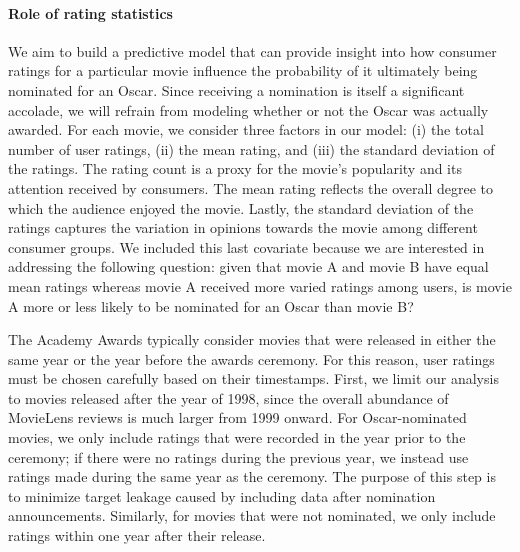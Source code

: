\documentclass[dvipsnames]{article}
\begin{document}
\paragraph{Role of rating statistics}\label{ssssec:lr}

We aim to build a predictive model that can provide insight into how consumer ratings for a particular movie influence the probability of it ultimately being nominated for an Oscar. Since receiving a nomination is itself a significant accolade, we will refrain from modeling whether or not the Oscar was actually awarded. For each movie, we consider three factors in our model: (i) the total number of user ratings, (ii) the mean rating, and (iii) the standard deviation of the ratings. The rating count is a proxy for the movie's popularity and its attention received by consumers. The mean rating reflects the overall degree to which the audience enjoyed the movie. Lastly, the standard deviation of the ratings captures the variation in opinions towards the movie among different consumer groups. We included this last covariate because we are interested in addressing the following question: given that movie A and movie B have equal mean ratings whereas movie A received more varied ratings among users, is movie A more or less likely to be nominated for an Oscar than movie B? 

The Academy Awards typically consider movies that were released in either the same year or the year before the awards ceremony. For this reason, user ratings must be chosen carefully based on their timestamps. First, we limit our analysis to movies released after the year of 1998, since the overall abundance of MovieLens reviews is much larger from 1999 onward. For Oscar-nominated movies, we only include ratings that were recorded in the year prior to the ceremony; if there were no ratings during the previous year, we instead use ratings made during the same year as the ceremony. The purpose of this step is to minimize target leakage caused by including data after nomination announcements. Similarly, for movies that were not nominated, we only include ratings within one year after their release.
\end{document}
